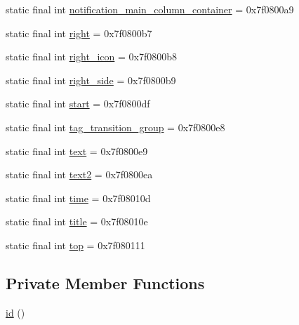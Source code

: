 \begin{DoxyCompactItemize}
\item 
static final int \mbox{\hyperlink{classandroid_1_1support_1_1v7_1_1recyclerview_1_1_r_1_1id_ab3bb3163b0e57fe866817147c9cf6daf}{notification\+\_\+main\+\_\+column\+\_\+container}} = 0x7f0800a9
\item 
static final int \mbox{\hyperlink{classandroid_1_1support_1_1v7_1_1recyclerview_1_1_r_1_1id_a32fd247d03245cc4df54cb6e92a1d48e}{right}} = 0x7f0800b7
\item 
static final int \mbox{\hyperlink{classandroid_1_1support_1_1v7_1_1recyclerview_1_1_r_1_1id_adbb32d209cbc4651b3649361fa9589d9}{right\+\_\+icon}} = 0x7f0800b8
\item 
static final int \mbox{\hyperlink{classandroid_1_1support_1_1v7_1_1recyclerview_1_1_r_1_1id_af5f1a3cd603a2a722e8c1bfdec244706}{right\+\_\+side}} = 0x7f0800b9
\item 
static final int \mbox{\hyperlink{classandroid_1_1support_1_1v7_1_1recyclerview_1_1_r_1_1id_abad49879b0a3197ed72fd997cc05bc10}{start}} = 0x7f0800df
\item 
static final int \mbox{\hyperlink{classandroid_1_1support_1_1v7_1_1recyclerview_1_1_r_1_1id_a4e9c9dd88884bcc1f1f619072d31da22}{tag\+\_\+transition\+\_\+group}} = 0x7f0800e8
\item 
static final int \mbox{\hyperlink{classandroid_1_1support_1_1v7_1_1recyclerview_1_1_r_1_1id_a45089e18af035f2601a681173e7a52a2}{text}} = 0x7f0800e9
\item 
static final int \mbox{\hyperlink{classandroid_1_1support_1_1v7_1_1recyclerview_1_1_r_1_1id_a6e2b5d1ff0e263a6280932e2d572edb8}{text2}} = 0x7f0800ea
\item 
static final int \mbox{\hyperlink{classandroid_1_1support_1_1v7_1_1recyclerview_1_1_r_1_1id_a45100a406d89b4edab15304790e2cdf9}{time}} = 0x7f08010d
\item 
static final int \mbox{\hyperlink{classandroid_1_1support_1_1v7_1_1recyclerview_1_1_r_1_1id_ad991ba2a84a04eae17e80bf0149e4e36}{title}} = 0x7f08010e
\item 
static final int \mbox{\hyperlink{classandroid_1_1support_1_1v7_1_1recyclerview_1_1_r_1_1id_a892287b46da23e14501108cc558b9cd8}{top}} = 0x7f080111
\end{DoxyCompactItemize}
\subsection*{Private Member Functions}
\begin{DoxyCompactItemize}
\item 
\mbox{\hyperlink{classandroid_1_1support_1_1v7_1_1recyclerview_1_1_r_1_1id_ada938b9468196583ec81ce4334b5add3}{id}} ()
\end{DoxyCompactItemize}


